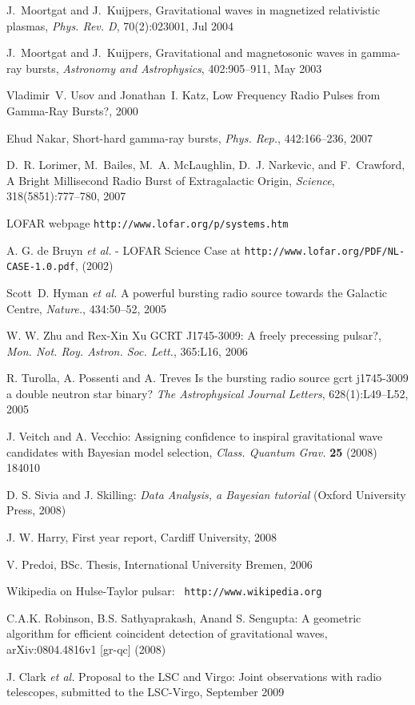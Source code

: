 \documentclass[epsf]{article}
\begin{document}
\begin{thebibliography}{99}
J.~Moortgat and J.~Kuijpers, Gravitational waves in magnetized relativistic plasmas, {\em Phys. Rev. D}, 70(2):023001, Jul 2004

J.~{Moortgat} and J.~{Kuijpers}, Gravitational and magnetosonic waves in gamma-ray bursts, {\em Astronomy and Astrophysics}, 402:905--911, May 2003

Vladimir~V. Usov and Jonathan~I. Katz, Low Frequency Radio Pulses from Gamma-Ray Bursts?, 2000

Ehud Nakar, Short-hard gamma-ray bursts, {\em Phys. Rep.}, 442:166--236, 2007

D.~R. Lorimer, M.~Bailes, M.~A. McLaughlin, D.~J. Narkevic, and F.~Crawford, A Bright Millisecond Radio Burst of Extragalactic Origin, {\em Science}, 318(5851):777--780, 2007

LOFAR webpage \verb|http://www.lofar.org/p/systems.htm|

A. G. de Bruyn {\it et al.} - LOFAR Science Case at \verb|http://www.lofar.org/PDF/NL-CASE-1.0.pdf|, (2002)

Scott~D. Hyman {\it et al.} A powerful bursting radio source towards the Galactic Centre, {\em Nature.}, 434:50--52, 2005

W. W. Zhu and Rex-Xin Xu GCRT J1745-3009: A freely precessing pulsar?, {\em Mon. Not. Roy. Astron. Soc. Lett.}, 365:L16, 2006

R. Turolla, A. Possenti and A. Treves Is the bursting radio source gcrt j1745-3009 a double neutron star binary? {\em The Astrophysical Journal Letters}, 628(1):L49--L52, 2005

J. Veitch and A. Vecchio: Assigning confidence to inspiral gravitational wave
candidates with Bayesian model selection, {\em Class. Quantum Grav.} {\bf 25} (2008) 184010 

D. S. Sivia and J. Skilling: {\it Data Analysis, a Bayesian tutorial} (Oxford University Press, 2008)

J. W. Harry, First year report, Cardiff University, 2008

V. Predoi, BSc. Thesis, International University Bremen, 2006

Wikipedia on Hulse-Taylor pulsar: \verb| http://www.wikipedia.org|

C.A.K. Robinson, B.S. Sathyaprakash, Anand S. Sengupta: A geometric algorithm for efficient coincident detection of gravitational waves, 	arXiv:0804.4816v1 [gr-qc] (2008)

J. Clark {\it et al.} Proposal to the LSC and Virgo: Joint observations with radio telescopes, submitted to the LSC-Virgo, September 2009 

\end{thebibliography}
\end{document}
